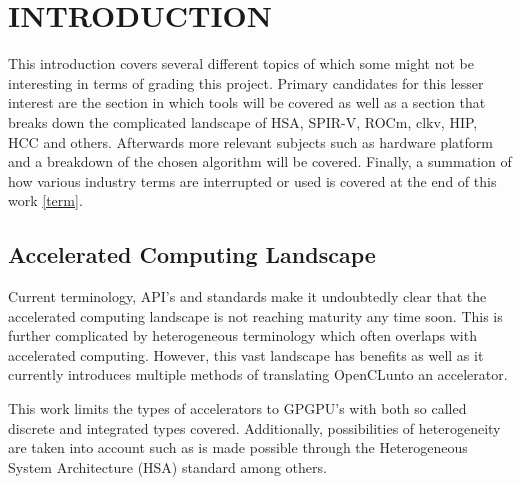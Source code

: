 \documentclass[conference]{IEEEtran}
\begin{document}
\renewcommand{\contentsname}{CONTENTS}
\tableofcontents{}

\hypersetup{
	linkcolor=blue
}

\twocolumn

\section*{INTRODUCTION}
This introduction covers several different topics of which some might not be
interesting in terms of grading this project. Primary candidates for this
lesser interest are the section in which tools will be covered as well as a
section that breaks down the complicated landscape of HSA, SPIR-V, ROCm, clkv,
HIP, HCC and others\footnotemark[1]. Afterwards more relevant subjects such as
hardware platform and a breakdown of the chosen algorithm will be covered.
Finally, a summation of how various industry terms are interrupted or used is
covered at the end of this work \ref{term}.


\subsection*{Accelerated Computing Landscape}

Current terminology, API's and standards make it undoubtedly clear that the
accelerated computing landscape is not reaching maturity any time soon. This is
further complicated by heterogeneous terminology which often overlaps with
accelerated computing. However, this vast landscape has benefits as well as it
currently introduces multiple methods of translating OpenCL\footnotemark[2]
unto an accelerator.


This work limits the types of accelerators to GPGPU's with both so called
discrete and integrated types covered. Additionally, possibilities of
heterogeneity are taken into account such as is made possible through the
Heterogeneous System Architecture (HSA) standard\cite{hsa1.2} among others.
\end{document}
